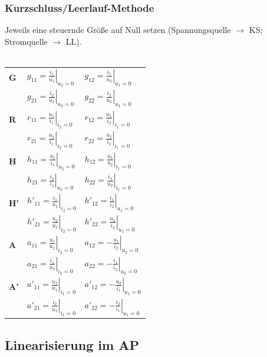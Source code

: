 \documentclass[a4paper,twocolumn,10pt]{article}
\begin{document}
\subsubsection*{Kurzschluss/Leerlauf-Methode}
Jeweils eine steuernde Größe auf Null setzen (Spannungsquelle $\rightarrow$ KS; Stromquelle $\rightarrow$ LL).\\\\
\begin{tabular}{lll}
\textbf{G} & $g_{11}=\left.\frac{i_1}{u_1}\right|_{u_2=0}$ & $g_{12}=\left.\frac{i_1}{u_2}\right|_{u_1=0}$\\
 & $g_{21}=\left.\frac{i_2}{u_1}\right|_{u_2=0}$ & $g_{22}=\left.\frac{i_2}{u_2}\right|_{u_1=0}$\\
\textbf{R} & $r_{11}=\left.\frac{u_1}{i_1}\right|_{i_2=0}$ & $r_{12}=\left.\frac{u_1}{i_2}\right|_{i_1=0}$\\
 & $r_{21}=\left.\frac{u_2}{i_1}\right|_{i_2=0}$ & $r_{22}=\left.\frac{u_2}{i_2}\right|_{i_1=0}$\\
\textbf{H} & $h_{11}=\left.\frac{u_1}{i_1}\right|_{u_2=0}$ & $h_{12}=\left.\frac{u_1}{u_2}\right|_{i_1=0}$\\
 & $h_{21}=\left.\frac{i_2}{i_1}\right|_{u_2=0}$ & $h_{22}=\left.\frac{i_2}{u_2}\right|_{i_1=0}$\\
\textbf{H'} & $h'_{11}=\left.\frac{i_1}{u_1}\right|_{i_2=0}$ & $h'_{12}=\left.\frac{i_1}{i_2}\right|_{u_1=0}$\\
 & $h'_{21}=\left.\frac{u_2}{u_1}\right|_{i_2=0}$ & $h'_{22}=\left.\frac{u_2}{i_2}\right|_{u_1=0}$\\
\textbf{A} & $a_{11}=\left.\frac{u_1}{u_2}\right|_{i_2=0}$ & $a_{12}=\left.-\frac{u_1}{i_2}\right|_{u_2=0}$\\
 & $a_{21}=\left.\frac{i_1}{u_2}\right|_{i_2=0}$ & $a_{22}=\left.-\frac{i_1}{i_2}\right|_{u_2=0}$\\
\textbf{A'} & $a'_{11}=\left.\frac{u_2}{u_1}\right|_{i_1=0}$ & $a'_{12}=\left.-\frac{u_2}{i_1}\right|_{u_1=0}$\\
 & $a'_{21}=\left.\frac{i_2}{u_1}\right|_{i_1=0}$ & $a'_{22}=\left.-\frac{i_2}{i_1}\right|_{u_1=0}$
\end{tabular}

\subsection*{Linearisierung im AP}
\end{document}
